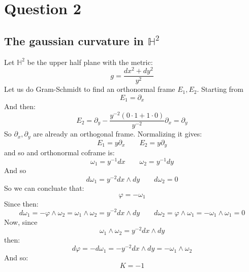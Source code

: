 \documentclass{article}
\begin{document}
\section*{Question 2}
\subsection*{The gaussian curvature in $\mathbb{H}^2$}
Let $\mathbb{H}^2$ be the upper half plane with the metric:
\begin{equation}
    g = \frac{dx^2 + dy^2}{y^2}
\end{equation}
Let us do Gram-Schmidt to find an orthonormal frame $E_1, E_2$. Starting from
\begin{equation}
    E_1 = \partial_x
\end{equation}
And then:
\begin{equation}
    E_2 = \partial_y - \frac{y^{-2}\left(0\cdot1 + 1\cdot0\right)}{y^{-2}}\partial_x = \partial_y
\end{equation}
So $\partial_x, \partial_y$ are already an orthogonal frame. Normalizing it gives:
\begin{equation}
    E_1 = y\partial_x \qquad E_2 = y\partial_y    
\end{equation}
and so and orthonormal coframe is:
\begin{equation}
    \omega_1 = y^{-1}dx \qquad \omega_2 = y^{-1}dy
\end{equation}
And so
\begin{equation}
    d\omega_1 = y^{-2}dx \wedge dy
    \qquad
    d\omega_2 = 0
\end{equation}
So we can concluate that:
\begin{equation}
    \varphi = -\omega_1
\end{equation}
Since then:
\begin{equation}
    d\omega_1 = -\varphi \wedge \omega_2 = \omega_1 \wedge \omega_2 = y^{-2}dx \wedge dy
    \qquad
    d\omega_2 = \varphi \wedge \omega_1 = -\omega_1 \wedge \omega_1 = 0
\end{equation}
Now, since
\begin{equation}
    \omega_1 \wedge \omega_2 = y^{-2} dx \wedge dy
\end{equation}
then:
\begin{equation}
    d\varphi = -d\omega_1 = -y^{-2}dx \wedge dy = -\omega_1 \wedge \omega_2
\end{equation}
And so:
\begin{equation}
    K = -1
\end{equation}
\end{document}

